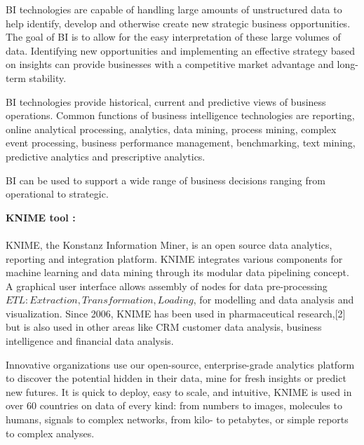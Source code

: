 \documentclass[10pt,a4paper]{article}
\begin{document}
BI technologies are capable of handling large amounts of unstructured data to help identify, develop and otherwise create new strategic business opportunities. The goal of BI is to allow for the easy interpretation of these large volumes of data. Identifying new opportunities and implementing an effective strategy based on insights can provide businesses with a competitive market advantage and long-term stability. 

BI technologies provide historical, current and predictive views of business operations. Common functions of business intelligence technologies are  reporting, online analytical processing, analytics, data mining, process mining, complex event processing, business performance management, benchmarking, text mining, predictive analytics and prescriptive analytics.

BI can be used to support a wide range of business decisions ranging from operational to strategic.


\textbf{KNIME tool :}\\
\\
KNIME, the Konstanz Information Miner, is an open source data analytics, reporting and integration platform. KNIME integrates various components for machine learning and data mining through its modular data pipelining concept. A graphical user interface allows assembly of nodes for data pre-processing \(ETL: Extraction, Transformation, Loading\), for modelling and data analysis and visualization.
Since 2006, KNIME has been used in pharmaceutical research,[2] but is also used in other areas like CRM customer data analysis, business intelligence and financial data analysis.


Innovative organizations use our open-source, enterprise-grade analytics platform to discover the potential hidden in their data, mine for fresh insights or predict new futures. It is quick to deploy, easy to scale, and intuitive, KNIME is used in over 60 countries on data of every kind: from numbers to images, molecules to humans, signals to complex networks, from kilo- to petabytes, or simple reports to complex analyses.
\newpage
\end{document}
